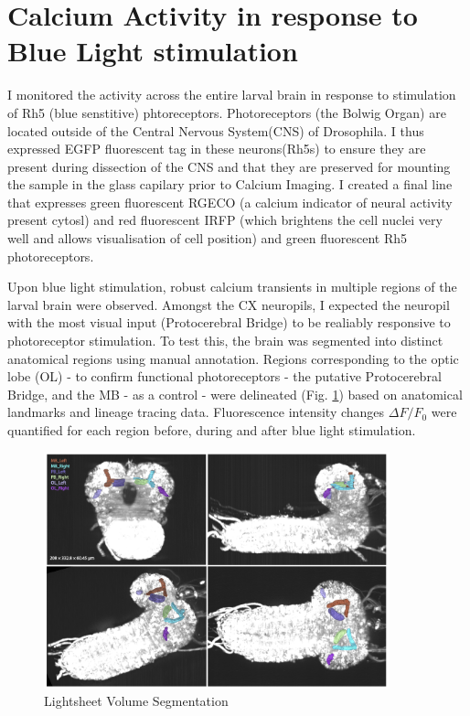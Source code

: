 \section{Calcium Activity in response to Blue Light stimulation}
I monitored the activity across the entire larval brain in response to stimulation of Rh5 (blue senstitive) phtoreceptors. Photoreceptors (the Bolwig Organ) are located outside of the Central Nervous System(CNS) of Drosophila. I thus expressed EGFP fluorescent tag in these neurons(Rh5s) to ensure they are present during dissection of the CNS and that they are preserved for mounting the sample in the glass capilary prior to Calcium Imaging. I created a final line that expresses green fluorescent RGECO (a calcium indicator of neural activity present cytosl) and red fluorescent IRFP (which brightens the cell nuclei very well and allows visualisation of cell position) and green fluorescent Rh5 photoreceptors. 

Upon blue light stimulation, robust calcium transients in multiple regions of the larval brain were observed. Amongst the CX neuropils, I expected the neuropil with the most visual input (Protocerebral Bridge) to be realiably responsive to photoreceptor stimulation. To test this, the brain was segmented into distinct anatomical regions using manual annotation. Regions corresponding to the optic lobe (OL) - to confirm functional photoreceptors - the putative Protocerebral Bridge, and the MB - as a control -  were delineated (Fig. \ref{LSSegmentation}) based on anatomical landmarks and lineage tracing data. Fluorescence intensity changes $\Delta F/F_0$ were quantified for each region before, during and after blue light stimulation. 

   \begin{figure}
        \centering
        \includegraphics[width=10cm]{Figs/CX/LSSegmentation.pdf}
        \caption[Lightsheet volume Segmentation]{Lightsheet Volume Segmentation}
        \label{LSSegmentation}
    \end{figure}

